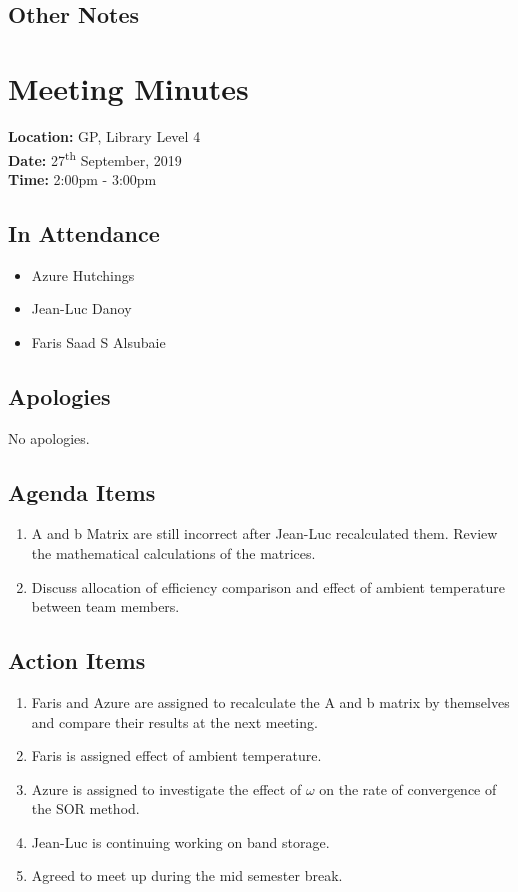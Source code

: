 \documentclass{article}
\begin{document}
\subsection*{Other Notes}

\pagebreak

\section{Meeting Minutes}
\textbf{Location:} GP, Library Level 4 \\
\textbf{Date:} 27\textsuperscript{th} September, 2019 \\
\textbf{Time:} 2:00pm - 3:00pm

\subsection*{In Attendance}
\begin{itemize}
\item Azure Hutchings
\item Jean-Luc Danoy
\item Faris Saad S Alsubaie
\end{itemize}

\subsection*{Apologies}
No apologies. 

\subsection*{Agenda Items}
\begin{enumerate}
\item A and b Matrix are still incorrect after Jean-Luc recalculated them. Review the mathematical calculations of the matrices.
\item Discuss allocation of efficiency comparison and effect of ambient temperature between team members. 
\ 
\end{enumerate}

\subsection*{Action Items}
\begin{enumerate}
\item Faris and Azure are assigned to recalculate the A and b matrix by themselves and compare their results at the next meeting.
\item Faris is assigned effect of ambient temperature.
\item Azure is assigned to investigate the effect of $\omega$ on the rate of convergence of the SOR method.
\item Jean-Luc is continuing working on band storage.
\item Agreed to meet up during the mid semester break.
\end{enumerate}
\end{document}
